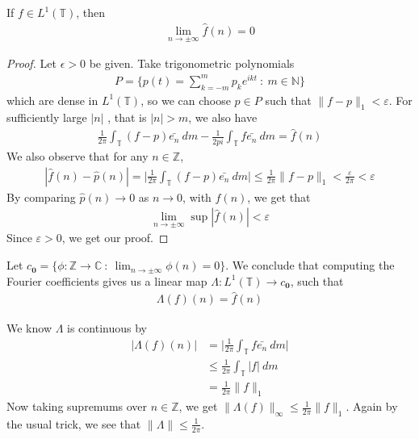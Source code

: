 \begin{theorem}
  If $f \in L^1(\mathbb{T})$,  then
  \begin{align*}
    \lim_{n \to \pm \infty}  \hat{f}(n) = 0
  \end{align*}
\end{theorem}
\begin{proof}
  Let $\epsilon > 0$ be given. Take trigonometric polynomials
  \begin{align*}
    P = \Big \{ p(t) = \sum_{k = -m}^{m} p_ke^{ikt} \ : \ m \in
    \mathbb{N} \Big \}
  \end{align*}
  which are dense in $L^{1}(\mathbb{T})$, so we can choose $p \in P$
  such that $\|f - p\|_1 < \varepsilon$. For sufficiently large $|n|$
  , that is $|n|> m$, we also have
  \begin{align*}
    \frac{1}{2\pi} \int_{\mathbb{T}} (f-p) \bar{e_n} \ dm -
    \frac{1}{2pi} \int_{\mathbb{T}}  f \bar{e_n} \ dm = \hat{f}(n)
  \end{align*}
  We also observe that for any $ n \in \mathbb{Z}$,
  \begin{align*}
    |\hat{f}(n) - \hat{p}(n)| = \Big| \frac{1}{2\pi}
    \int_{\mathbb{T}}  (f- p) \bar{e_n} \ dm \Big| \le \frac{1}{2\pi}
    \|f - p\|_1 < \frac{\varepsilon}{2\pi} < \varepsilon
  \end{align*}
  By comparing $\hat{p}(n) \to 0$ as $ n \to 0$, with $\hat{ f}(n)$,
  we get that
  \begin{align*}
    \lim_{n \to \pm \infty} \sup |\hat{f}(n)| < \varepsilon
  \end{align*}
  Since $\varepsilon > 0$, we get our proof.
\end{proof}

Let $c_{\textbf{0}} = \{ \phi: \mathbb{Z} \to \mathbb{C}  \ : \
\lim_{n \to \pm \infty}  \phi(n) = 0 \}$. We conclude that computing
the Fourier coefficients gives us a linear map $\Lambda:
L^{1}(\mathbb{T}) \to c_{\textbf{0}}$, such that
\begin{align*}
  \Lambda(f)(n) = \hat{f}(n)
\end{align*}

We know $\Lambda$ is continuous by
\begin{align*}
  |\Lambda(f)(n)| &= \Big| \frac{1}{2\pi} \int_{\mathbb{T}}  f
  \bar{e_n} \ d m\Big| \\
  &\le \frac{1}{2\pi} \int_{\mathbb{T}} |f|  \ d m \\
  &= \frac{1}{2\pi} \|f\|_1
\end{align*}
Now taking supremums over $n \in \mathbb{Z}$, we get
$\|\Lambda(f)\|_\infty \le \frac{1}{2\pi} \|f\|_1$. Again by the
usual trick, we see that $\|\Lambda\| \le \frac{1}{2\pi}$.

